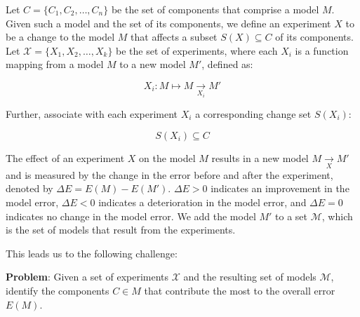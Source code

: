 Let $C = \{C_1, C_2, \ldots, C_n\}$ be the set of components that comprise a model $M$.
Given such a model and the set of its components, we define an experiment $X$ to be a change to the model $M$ that affects a subset $S(X) \subseteq C$ of its components.
Let $\mathcal{X} = \{X_1, X_2, \ldots, X_k\}$ be the set of experiments, where each $X_i$ is a function mapping from a model $M$ to a new model $M'$, defined as:

$$
X_i: M \mapsto M\underset{X_i}{\rightarrow}M'
$$

Further, associate with each experiment $X_i$ a corresponding change set $S(X_i)$:

$$
S(X_i) \subseteq C
$$

The effect of an experiment $X$ on the model $M$ results in a new model $M\underset{X}{\rightarrow}M'$ and is measured by the change in the error before and after the experiment, denoted by $\Delta E = E(M) - E(M')$.
$\Delta E > 0$ indicates an improvement in the model error, $\Delta E < 0$ indicates a deterioration in the model error, and  $\Delta E = 0$ indicates no change in the model error.
We add the model $M'$ to a set  $\mathcal{M}$, which is the set of models that result from the experiments.

This leads us to the following challenge:

\textbf{Problem}: Given a set of experiments $\mathcal{X}$ and the resulting set of models $\mathcal{M}$, identify the components $C \in M$ that contribute the most to the overall error $E(M)$. 
